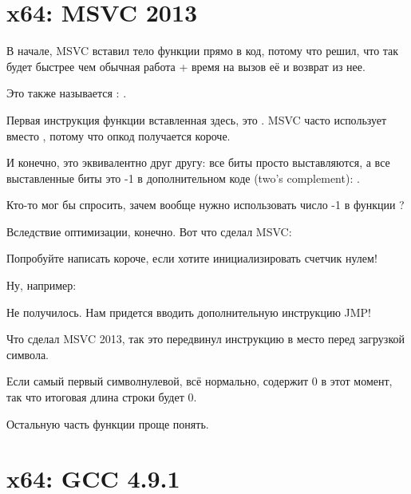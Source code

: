 ﻿\section{x64: \Optimizing MSVC 2013}



В начале, MSVC вставил тело функции \strlen{} прямо в код, потому что решил, что так будет
быстрее чем обычная работа \strlen{} + время на вызов её и возврат из нее.

Это также называется : .

\label{using_OR_instead_of_MOV}
Первая инструкция функции \strlen{} вставленная здесь, это . 
MSVC часто использует  вместо , потому что опкод получается короче.

И конечно, это эквивалентно друг другу: все биты просто выставляются, а все выставленные
биты это -1 в дополнительном коде (two's complement): .

Кто-то мог бы спросить, зачем вообще нужно использовать число -1 в функции \strlen{}?

Вследствие оптимизации, конечно.
Вот что сделал MSVC:



Попробуйте написать короче, если хотите инициализировать счетчик нулем!

Ну, например:



Не получилось. Нам придется вводить дополнительную инструкцию JMP!

Что сделал MSVC 2013, так это передвинул инструкцию  в место перед загрузкой символа.

Если самый первый символ\EMDASH{}нулевой, всё нормально, \RAX содержит 0 в этот момент, так что
итоговая длина строки будет 0.

Остальную часть функции проще понять.

\section{x64: \NonOptimizing GCC 4.9.1}

